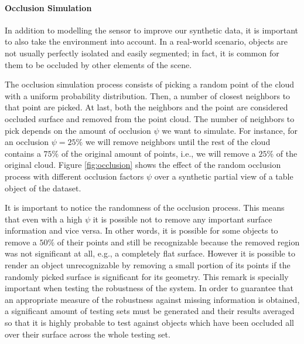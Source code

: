 \paragraph{Occlusion Simulation}

In addition to modelling the sensor to improve our synthetic data, it is important to also take the environment into account. In a real-world scenario, objects are not usually perfectly isolated and easily segmented; in fact, it is common for them to be occluded by other elements of the scene.

The occlusion simulation process consists of picking a random point of the cloud with a uniform probability distribution. Then, a number of closest neighbors to that point are picked. At last, both the neighbors and the point are considered occluded surface and removed from the point cloud. The number of neighbors to pick depends on the amount of occlusion $\psi$ we want to simulate. For instance, for an occlusion $\psi=25\%$ we will remove neighbors until the rest of the cloud contains a $75\%$ of the original amount of points, i.e., we will remove a $25\%$ of the original cloud. Figure \ref{fig:occlusion} shows the effect of the random occlusion process with different occlusion factors $\psi$ over a synthetic partial view of a table object of the dataset.

It is important to notice the randomness of the occlusion process. This means that even with a high $\psi$ it is possible not to remove any important surface information and vice versa. In other words, it is possible for some objects to remove a $50\%$ of their points and still be recognizable because the removed region was not significant at all, e.g., a completely flat surface. However it is possible to render an object unrecognizable by removing a small portion of its points if the randomly picked surface is significant for its geometry. This remark is specially important when testing the robustness of the system. In order to guarantee that an appropriate measure of the robustness against missing information is obtained, a significant amount of testing sets must be generated and their results averaged so that it is highly probable to test against objects which have been occluded all over their surface across the whole testing set.

